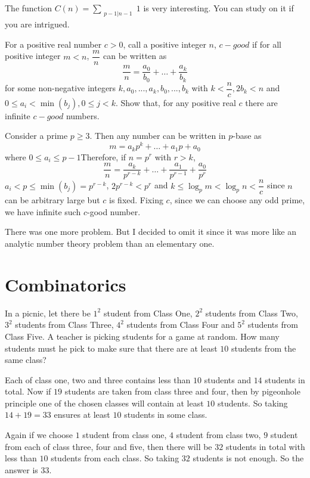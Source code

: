 \documentclass{subfile}
\begin{document}
		\begin{note}
			The function $C(n)=\sum_{\substack{p-1|n-1}}^{}1$ is very interesting. You can study on it if you are intrigued.
		\end{note}
		
		\begin{problem}
			For a positive real number $c>0$, call a positive integer $n$, $c-good$ if for all positive integer $m<n$, $\dfrac mn$ can be written as \[\dfrac mn=\dfrac{a_0}{b_0}+\ldots+\dfrac{a_k}{b_k}\]
			for some non-negative integers $k,a_0,...,a_k,b_0,...,b_k$ with $k<\dfrac nc, 2b_k< n$ and $0\leq a_i< \min(b_j),0\leq j<k$.
			Show that, for any positive real $c$ there are infinite $c-good$ numbers.
		\end{problem}
		
		\begin{solution}
			Consider a prime $p\geq3$. Then any number can be written in $p$-base as
			\[m=a_kp^k+\ldots+a_1p+a_0\]
			where $0\leq a_i\leq p-1$Therefore, if $n=p^r$ with $r>k$, \[\dfrac{m}{n}=\dfrac{a_k}{p^{r-k}}+\ldots+\dfrac{a_1}{p^{r-1}}+\dfrac{a_0}{p^r}\]
			$a_i<p\leq \min(b_j)=p^{r-k}$, $2p^{r-k}<p^r$ and $k\leq \log_p{m}<\log_p{n}<\dfrac{n}{c}$ since $n$ can be arbitrary large but $c$ is fixed. Fixing $c$, since we can choose any odd prime, we have infinite such $c$-good number.
		\end{solution}
		
		\begin{note}
			There was one more problem. But I decided to omit it since it was more like an analytic number theory problem than an elementary one.
		\end{note}
		
		\section{Combinatorics}
		
		\begin{problem}
			In a picnic, let there be $1^2$ student from Class One, $2^2$ students from Class Two, $3^2$ students from Class Three, $4^2$ students from Class Four and $5^2$ students from Class Five. A teacher is picking students for a game at random. How many students must he pick to make sure that there are at least $10$ students from the same class?
		\end{problem}
		
		\begin{solution}
		    Each of class one, two and three contains less than $10$ students and $14$ students in total. Now if $19$ students are taken from class three and four, then by pigeonhole principle one of the chosen classes will contain at least $10$ students. So taking $14+19=33$ ensures at least $10$ students in some class.
            
            Again if we choose $1$ student from class one, $4$ student from class two, $9$ student from each of class three, four and five, then there will be $32$ students in total with less than $10$ students from each class. So taking $32$ students is not enough. So the answer is $33$.
        \end{solution}
\end{document}
